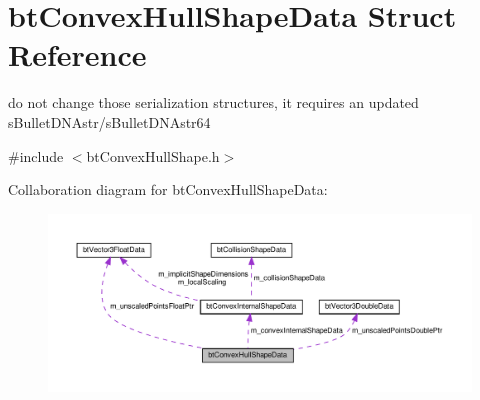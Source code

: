 \hypertarget{structbtConvexHullShapeData}{}\section{bt\+Convex\+Hull\+Shape\+Data Struct Reference}
\label{structbtConvexHullShapeData}


do not change those serialization structures, it requires an updated s\+Bullet\+D\+N\+Astr/s\+Bullet\+D\+N\+Astr64  




{\ttfamily \#include $<$bt\+Convex\+Hull\+Shape.\+h$>$}



Collaboration diagram for bt\+Convex\+Hull\+Shape\+Data\+:
\nopagebreak
\begin{figure}[H]
\begin{center}
\leavevmode
\includegraphics[width=350pt]{structbtConvexHullShapeData__coll__graph}
\end{center}
\end{figure}
